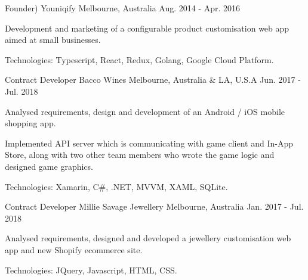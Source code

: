 \begin{cventries}
\cventry
{Founder)} %
{Youniqify} %
{Melbourne, Australia} %
{Aug. 2014 - Apr. 2016} %
{
  \begin{cvitems} %
    \item {Development and marketing of a configurable product customisation web app aimed at small businesses.}
    \item {Technologies: Typescript, React, Redux, Golang, Google Cloud Platform.} 
  \end{cvitems}
}

\cventry
{Contract Developer} %
{Bacco Wines} %
{Melbourne, Australia \& LA, U.S.A} %
{Jun. 2017 - Jul. 2018} %
{
  \begin{cvitems} %
    \item {Analysed requirements, design and development of an Android / iOS mobile shopping app.}
    \item {Implemented API server which is communicating with game client and In-App Store, along with two other team members who wrote the game logic and designed game graphics.}
    \item {Technologies: Xamarin, C\#, .NET, MVVM, XAML, SQLite.}
  \end{cvitems}
}

\cventry
{Contract Developer} %
{Millie Savage Jewellery} %
{Melbourne, Australia} %
{Jan. 2017 - Jul. 2018} %
{
  \begin{cvitems} %
    \item {Analysed requirements, designed and developed a jewellery customisation web app and new Shopify ecommerce site.}
    \item {Technologies: JQuery, Javascript, HTML, CSS.}
  \end{cvitems}
}


\end{cventries}

